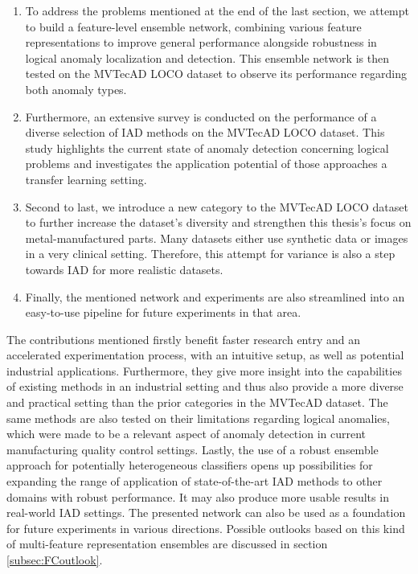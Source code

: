 \begin{enumerate}
\item To address the problems mentioned at the end of the last section, we attempt 
to build a feature-level ensemble network, combining various feature representations to improve 
general performance alongside robustness in logical anomaly localization and detection. This ensemble network is then tested on 
the MVTecAD LOCO dataset \cite{LOCODentsAndScratchesBergmann2022} to observe its performance regarding both anomaly types.
\item Furthermore, an extensive survey is conducted on the performance of a diverse selection of IAD methods on the MVTecAD LOCO dataset. 
This study highlights the current state of anomaly detection concerning logical problems and investigates the application potential of 
those approaches a transfer learning setting.
\item Second to last, we introduce a new category to the MVTecAD LOCO dataset to further increase the dataset's diversity and strengthen this thesis's focus on metal-manufactured parts. Many datasets either use synthetic data or images in a very clinical setting. Therefore, this 
attempt for variance is also a step towards IAD for more realistic datasets.
\item Finally, the mentioned network and experiments are also streamlined into an easy-to-use pipeline 
for future experiments in that area.
\end{enumerate}


The contributions mentioned firstly benefit faster research entry and an accelerated experimentation process, with an intuitive setup, 
as well as potential industrial applications. 
Furthermore, they give more insight into the capabilities of existing methods in an industrial setting and thus also provide a more 
diverse and practical setting than the prior categories in the MVTecAD \cite{MVTEC_Bergmann_2021} dataset. The same methods are also tested on their limitations 
regarding logical anomalies, which were made to be a relevant aspect of anomaly detection in current manufacturing quality control 
settings. Lastly, the use of a robust ensemble approach for potentially heterogeneous classifiers opens up possibilities for expanding 
the range of application of state-of-the-art IAD methods to other domains with robust performance. It may also produce more usable results in real-world IAD settings. The presented network can also be used as a foundation for future experiments in 
various directions. Possible outlooks based on this kind of multi-feature representation ensembles are discussed in section \ref{subsec:FCoutlook}.
\newline
\newline

